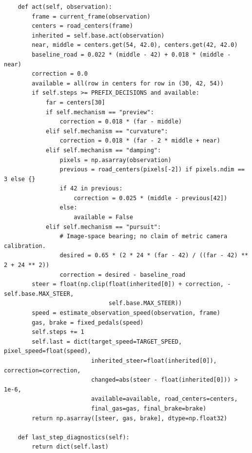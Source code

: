 \documentclass[11pt,a4paper]{article}
\begin{document}
\begin{lstlisting}
    def act(self, observation):
        frame = current_frame(observation)
        centers = road_centers(frame)
        inherited = self.base.act(observation)
        near, middle = centers.get(54, 42.0), centers.get(42, 42.0)
        baseline_road = 0.022 * (middle - 42) + 0.018 * (middle - near)
        correction = 0.0
        available = all(row in centers for row in (30, 42, 54))
        if self.steps >= PREFIX_DECISIONS and available:
            far = centers[30]
            if self.mechanism == "preview":
                correction = 0.018 * (far - middle)
            elif self.mechanism == "curvature":
                correction = 0.018 * (far - 2 * middle + near)
            elif self.mechanism == "damping":
                pixels = np.asarray(observation)
                previous = road_centers(pixels[-2]) if pixels.ndim == 3 else {}
                if 42 in previous:
                    correction = 0.025 * (middle - previous[42])
                else:
                    available = False
            elif self.mechanism == "pursuit":
                # Image-space bearing; no claim of metric camera calibration.
                desired = 0.65 * (2 * 24 * (far - 42) / ((far - 42) ** 2 + 24 ** 2))
                correction = desired - baseline_road
        steer = float(np.clip(float(inherited[0]) + correction, -self.base.MAX_STEER,
                              self.base.MAX_STEER))
        speed = estimate_observation_speed(observation, frame)
        gas, brake = fixed_pedals(speed)
        self.steps += 1
        self.last = dict(target_speed=TARGET_SPEED, pixel_speed=float(speed),
                         inherited_steer=float(inherited[0]), correction=correction,
                         changed=abs(steer - float(inherited[0])) > 1e-6,
                         available=available, road_centers=centers,
                         final_gas=gas, final_brake=brake)
        return np.asarray([steer, gas, brake], dtype=np.float32)

    def last_step_diagnostics(self):
        return dict(self.last)

\end{lstlisting}

\clearpage
\end{document}
